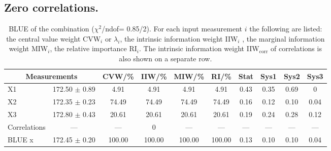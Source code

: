 \subsection{Zero correlations.}
\begin{table}[H]
\scriptsize
\begin{center}
\renewcommand{\arraystretch}{1.1}
\begin{tabular}{|lc|c|c|c|c|cccc|}
\hline
\multicolumn{2}{|c|}{Measurements} & CVW/\%  & IIW/\%  & MIW/\%  & RI/\%  & {\tiny Stat} & {\tiny Sys1} & {\tiny Sys2} & {\tiny Sys3}\\
\hline
X1 &     172.50 $\pm$       0.89 &       4.91 &       4.91 &       4.91 &       4.91 &       0.43 &       0.35 &       0.69 &  0\\
X2 &     172.35 $\pm$       0.23 &      74.49 &      74.49 &      74.49 &      74.49 &       0.16 &       0.12 &       0.10 &       0.04\\
X3 &     172.80 $\pm$       0.43 &      20.61 &      20.61 &      20.61 &      20.61 &       0.19 &       0.24 &       0.28 &       0.12\\
Correlations & --- & --- &  0 & --- & --- & --- & --- & --- & ---\\
\hline
BLUE {\tiny x} &     172.45 $\pm$       0.20 &     100.00 &     100.00 &     100.00 &     100.00 &       0.13 &       0.10 &       0.10 &       0.04\\
\hline
\end{tabular}
\caption{BLUE of the combination ($\chi^2$/ndof=      0.85/2).
 For each input measurement $i$ the following are listed: the central value weight CVW$_i$ or $\lambda_i$, the intrinsic information weight IIW$_i$ , the marginal information weight MIW$_i$, the relative importance RI$_i$. The intrinsic information weight IIW$_{\mathrm{corr}}$ of correlations is also shown on a separate row.}
\renewcommand{\arraystretch}{1}
\end{center}
\end{table}
